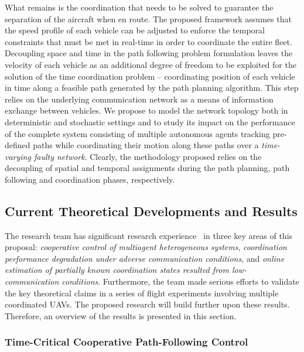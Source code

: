 \documentclass[letter,onecolumn,12pt]{aiaa-tc}
\newcommand{\1}{1_n}
\begin{document}
What remains is the coordination that needs to be solved to guarantee the separation of the aircraft when en route. The proposed framework assumes that the speed profile of each vehicle can be adjusted to enforce the temporal constraints that must be met in real-time in order to coordinate the entire fleet. Decoupling space and time in the path following problem formulation leaves the velocity of each  vehicle as an additional  degree of freedom to be exploited for the solution of the time coordination problem -- coordinating position of each vehicle in time along a feasible path generated by the path planning algorithm.  This step relies on the underlying communication network as a means of information exchange between vehicles. We propose to model the network topology both in deterministic and stochastic settings and to study its impact on the performance of the complete system consisting of multiple autonomous agents tracking pre-defined paths while coordinating their motion along these paths over a \emph{ time-varying faulty network}. Clearly, the methodology proposed relies on the decoupling of spatial and temporal assignments during the path planning, path following and coordination phases, respectively.

\subsection{Current Theoretical Developments and Results}
\label{subsec:current_develop}

The research team has significant research experience~\cite{xargay2012csm} in three key areas of this proposal: \emph{cooperative control of multiagent heterogeneous systems}, \emph{coordination performance degradation under adverse communication conditions}, and \emph{online estimation of partially known coordination states resulted from low-communication conditions}. Furthermore, the team made serious efforts to validate the key theoretical claims in a series of flight experiments involving multiple coordinated UAVs. The proposed research will build further upon these results. Therefore, an overview of the results is presented in this section.

\subsubsection{Time-Critical Cooperative Path-Following Control}
\end{document}
